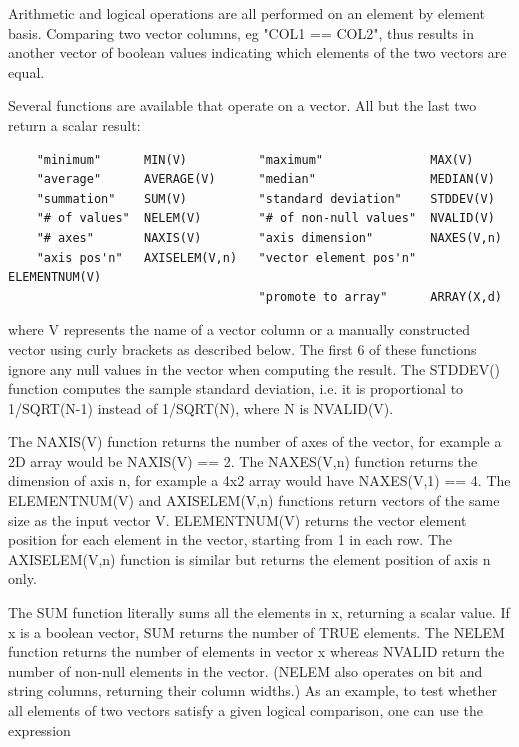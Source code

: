 \documentclass[11pt]{book}
\begin{document}
    Arithmetic and logical operations are all performed on an element by
    element basis.  Comparing two vector columns,  eg  "COL1  ==  COL2",
    thus  results  in  another vector of boolean values indicating which
    elements of the two vectors are equal.

    Several functions are available that operate on a vector.  All but
    the last two return a scalar result:

\begin{verbatim}
    "minimum"      MIN(V)          "maximum"               MAX(V)
    "average"      AVERAGE(V)      "median"                MEDIAN(V)
    "summation"    SUM(V)          "standard deviation"    STDDEV(V)
    "# of values"  NELEM(V)        "# of non-null values"  NVALID(V)
    "# axes"       NAXIS(V)        "axis dimension"        NAXES(V,n)
    "axis pos'n"   AXISELEM(V,n)   "vector element pos'n"  ELEMENTNUM(V)
                                   "promote to array"      ARRAY(X,d)
\end{verbatim}
    where V represents the name of a vector column or a manually
    constructed vector using curly brackets as described below.  The
    first 6 of these functions ignore any null values in the vector when
    computing the result.  The STDDEV() function computes the sample
    standard deviation, i.e. it is proportional to 1/SQRT(N-1) instead
    of 1/SQRT(N), where N is NVALID(V).

    The NAXIS(V) function returns the number of axes of the vector,
    for example a 2D array would be NAXIS(V) == 2.  The NAXES(V,n)
    function returns the dimension of axis n, for example a 4x2 array
    would have NAXES(V,1) == 4.  The ELEMENTNUM(V) and AXISELEM(V,n)
    functions return vectors of the same size as the input vector V.
    ELEMENTNUM(V) returns the vector element position for each element
    in the vector, starting from 1 in each row.  The AXISELEM(V,n)
    function is similar but returns the element position of axis n
    only.

    The SUM function literally sums all  the elements in x,  returning a
    scalar value.   If x  is  a  boolean  vector, SUM returns the number
    of TRUE elements. The NELEM function  returns the number of elements
    in vector x whereas NVALID return the number of non-null elements in
    the  vector.   (NELEM  also  operates  on  bit  and string  columns,
    returning their column widths.)  As an example, to  test whether all
    elements of two vectors satisfy a  given logical comparison, one can
    use the expression
\end{document}
